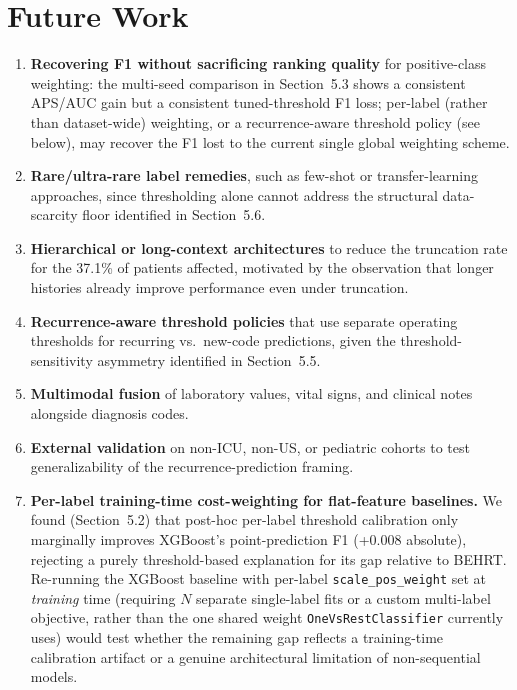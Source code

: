 \documentclass[11pt]{article}
\begin{document}
\section{Future Work}

\begin{enumerate}
  \item \textbf{Recovering F1 without sacrificing ranking quality} for
    positive-class weighting: the multi-seed comparison in Section~5.3
    shows a consistent APS/AUC gain but a consistent tuned-threshold F1
    loss; per-label (rather than dataset-wide) weighting, or a
    recurrence-aware threshold policy (see below), may recover the F1 lost
    to the current single global weighting scheme.
  \item \textbf{Rare/ultra-rare label remedies}, such as few-shot or
    transfer-learning approaches, since thresholding alone cannot address the
    structural data-scarcity floor identified in Section~5.6.
  \item \textbf{Hierarchical or long-context architectures} to reduce the
    truncation rate for the 37.1\% of patients affected, motivated by the
    observation that longer histories already improve performance even under
    truncation.
  \item \textbf{Recurrence-aware threshold policies} that use separate
    operating thresholds for recurring vs.\ new-code predictions, given the
    threshold-sensitivity asymmetry identified in Section~5.5.
  \item \textbf{Multimodal fusion} of laboratory values, vital signs, and
    clinical notes alongside diagnosis codes.
  \item \textbf{External validation} on non-ICU, non-US, or pediatric
    cohorts to test generalizability of the recurrence-prediction framing.
  \item \textbf{Per-label training-time cost-weighting for flat-feature
    baselines.} We found (Section~5.2) that post-hoc per-label threshold
    calibration only marginally improves XGBoost's point-prediction F1
    (+0.008 absolute), rejecting a purely threshold-based explanation for its
    gap relative to BEHRT. Re-running the XGBoost baseline with per-label
    \texttt{scale\_pos\_weight} set at \emph{training} time (requiring $N$
    separate single-label fits or a custom multi-label objective, rather
    than the one shared weight \texttt{OneVsRestClassifier} currently uses)
    would test whether the remaining gap reflects a training-time
    calibration artifact or a genuine architectural limitation of
    non-sequential models.
\end{enumerate}
\end{document}
